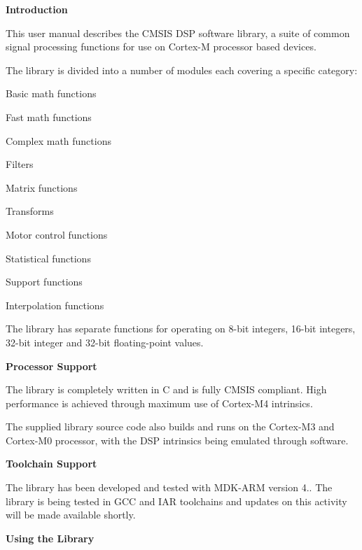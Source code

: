 {\bfseries Introduction}

This user manual describes the C\-M\-S\-I\-S D\-S\-P software library, a suite of common signal processing functions for use on Cortex-\/\-M processor based devices.

The library is divided into a number of modules each covering a specific category\-:
\begin{DoxyItemize}
\item Basic math functions
\item Fast math functions
\item Complex math functions
\item Filters
\item Matrix functions
\item Transforms
\item Motor control functions
\item Statistical functions
\item Support functions
\item Interpolation functions
\end{DoxyItemize}

The library has separate functions for operating on 8-\/bit integers, 16-\/bit integers, 32-\/bit integer and 32-\/bit floating-\/point values.

{\bfseries Processor Support}

The library is completely written in C and is fully C\-M\-S\-I\-S compliant. High performance is achieved through maximum use of Cortex-\/\-M4 intrinsics.

The supplied library source code also builds and runs on the Cortex-\/\-M3 and Cortex-\/\-M0 processor, with the D\-S\-P intrinsics being emulated through software.

{\bfseries Toolchain Support}

The library has been developed and tested with M\-D\-K-\/\-A\-R\-M version 4.. The library is being tested in G\-C\-C and I\-A\-R toolchains and updates on this activity will be made available shortly.

{\bfseries Using the Library}

